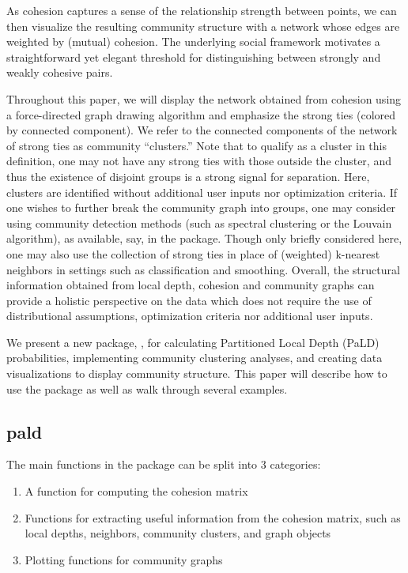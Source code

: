 As cohesion captures a sense of the relationship strength between
points, we can then visualize the resulting community structure with a
network whose edges are weighted by (mutual) cohesion. The underlying
social framework motivates a straightforward yet elegant threshold for
distinguishing between strongly and weakly cohesive pairs.

Throughout this paper, we will display the network obtained from
cohesion using a force-directed graph drawing algorithm and emphasize
the strong ties (colored by connected component). We refer to the
connected components of the network of strong ties as community
``clusters.'' Note that to qualify as a cluster in this definition, one
may not have any strong ties with those outside the cluster, and thus
the existence of disjoint groups is a strong signal for separation.
Here, clusters are identified without additional user inputs nor
optimization criteria. If one wishes to further break the community
graph into groups, one may consider using community detection methods
(such as spectral clustering or the Louvain algorithm), as available,
say, in the  package. Though only briefly considered
here, one may also use the collection of strong ties in place of
(weighted) k-nearest neighbors in settings such as classification and
smoothing. Overall, the structural information obtained from local
depth, cohesion and community graphs can provide a holistic perspective
on the data which does not require the use of distributional
assumptions, optimization criteria nor additional user inputs.

We present a new package, , for calculating Partitioned
Local Depth (PaLD) probabilities, implementing community clustering
analyses, and creating data visualizations to display community
structure. This paper will describe how to use the package as well as
walk through several examples.

\hypertarget{pald}{%
\subsection{pald}\label{pald}}

The main functions in the  package can be split into 3
categories:

\begin{enumerate}
\def\labelenumi{\arabic{enumi}.}
\tightlist
\item
  A function for computing the cohesion matrix
\item
  Functions for extracting useful information from the cohesion matrix,
  such as local depths, neighbors, community clusters, and graph objects
\item
  Plotting functions for community graphs
\end{enumerate}

